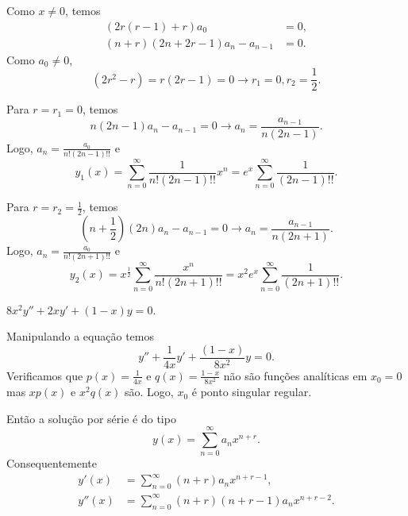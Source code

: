 \documentclass[a4paper,12pt, leqno, answers]{exam}
\begin{document}
\begin{questions}
\begin{solution}
        Como $x \neq 0$, temos
        \begin{align*}
            \left( 2 r \left( r - 1 \right) + r \right) a_0 &= 0, \\
            \left( n + r \right) \left( 2 n + 2 r - 1 \right) a_n - a_{n - 1} &= 0.
        \end{align*}
        Como $a_0 \neq 0$,
        \[
        \left( 2 r^2 - r \right) = r (2 r - 1) = 0 \rightarrow r_1 = 0, r_2 = \frac{1}{2}.
        \]

        Para $r = r_1 = 0$, temos
        \[
        n \left( 2 n - 1 \right) a_n - a_{n - 1} = 0 \rightarrow a_n = \frac{a_{n - 1}}{n \left( 2n - 1 \right)}.
        \]
        Logo, $a_n = \frac{a_0}{n! \left( 2n - 1 \right)!!}$ e
        \[
        y_1(x) = \sum_{n = 0}^\infty \frac{1}{n! \left( 2 n - 1 \right)!!} x^n = e^x \sum_{n = 0}^\infty \frac{1}{\left( 2n - 1 \right)!!}.
        \]

        Para $r = r_2 = \frac{1}{2}$, temos
        \[
        \left( n + \frac{1}{2} \right) \left( 2n \right) a_n - a_{n - 1} = 0 \rightarrow a_n = \frac{a_{n - 1}}{n \left( 2n + 1 \right)}.
        \]
        Logo, $a_n = \frac{a_0}{n! \left( 2 n + 1 \right)!!}$ e
        \[
        y_2(x) = x^{\frac{1}{2}} \sum_{n = 0}^\infty \frac{x^n}{n! \left( 2 n + 1 \right)!!} = x^2 e^x \sum_{n = 0}^\infty \frac{1}{\left( 2n + 1 \right)!!}.
        \]
    \end{solution}

    \question $8 x^2 y'' + 2 x y' + \left( 1 - x \right) y = 0$.
    \begin{solution}
        Manipulando a equa\c{c}\~{a}o temos
        \[
        y'' + \frac{1}{4x} y' + \frac{\left( 1 - x \right)}{8x^2} y = 0.
        \]
        Verificamos que $p(x) = \frac{1}{4x}$ e $q(x) = \frac{1 - x}{8x^2}$ n\~{a}o s\~{a}o fun\c{c}\~{o}es anal\'{i}ticas em $x_0 = 0$ mas $x p(x)$ e $x^2 q(x)$ s\~{a}o. Logo, $x_0$ \'{e} ponto singular regular.

        Ent\~{a}o a solu\c{c}\~{a}o por s\'{e}rie \'{e} do tipo
        \[
        y\left( x \right) = \sum_{n = 0}^\infty a_n x^{n + r}.
        \]
        Consequentemente
        \begin{align*}
            y'(x) &= \sum_{n = 0}^\infty \left( n + r \right) a_n x^{n + r - 1}, \\
            y''(x) &= \sum_{n = 0}^\infty \left( n + r \right) \left( n + r - 1 \right) a_n x^{n + r - 2}.
        \end{align*}


\end{solution}
\end{questions}
\end{document}
